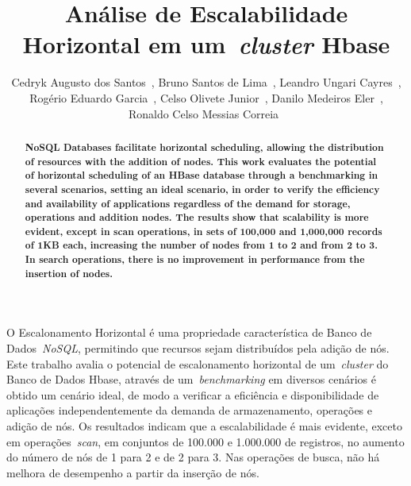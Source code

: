 \documentclass[12pt]{article}
\title{Análise de Escalabilidade Horizontal em um~\emph{cluster}  Hbase}
\author{Cedryk Augusto dos Santos~\inst{1}, Bruno Santos de Lima~\inst{1}, Leandro Ungari Cayres~\inst{1},\\Rogério Eduardo Garcia~\inst{1}, Celso Olivete Junior~\inst{1}, Danilo Medeiros Eler~\inst{1},\\ Ronaldo Celso Messias Correia~\inst{1}}
\begin{document}
 

\maketitle


\begin{abstract}
\textbf{NoSQL Databases facilitate horizontal scheduling, allowing the distribution of resources with the addition of nodes. This work evaluates the potential of horizontal scheduling of an HBase database through a benchmarking in several scenarios, setting an ideal scenario, in order to verify the efficiency and availability of applications regardless of the demand for storage, operations and addition nodes. The results show that scalability is more evident, except in scan operations, in sets of 100,000 and 1,000,000 records of 1KB each, increasing the number of nodes from 1 to 2 and from 2 to 3. In search operations, there is no improvement in performance from the insertion of nodes.}
\end{abstract}
     
\begin{resumo} 
O Escalonamento Horizontal é uma propriedade característica de Banco de Dados~\emph{NoSQL}, permitindo que recursos sejam distribuídos pela adição de nós.
Este trabalho avalia o potencial de escalonamento horizontal de um~\emph{cluster} do Banco de Dados Hbase, através de um~\emph{benchmarking} em diversos cenários é obtido um cenário ideal, de modo a verificar a eficiência e disponibilidade de aplicações independentemente da demanda de armazenamento, operações e adição de nós. Os resultados indicam que a escalabilidade é mais evidente, exceto em operações~\emph{scan}, em conjuntos de 100.000 e 1.000.000 de registros, no aumento do número de nós de 1 para 2 e de 2 para 3. Nas operações de busca, não há melhora de desempenho a partir da inserção de nós.
\end{resumo}
\end{document}
